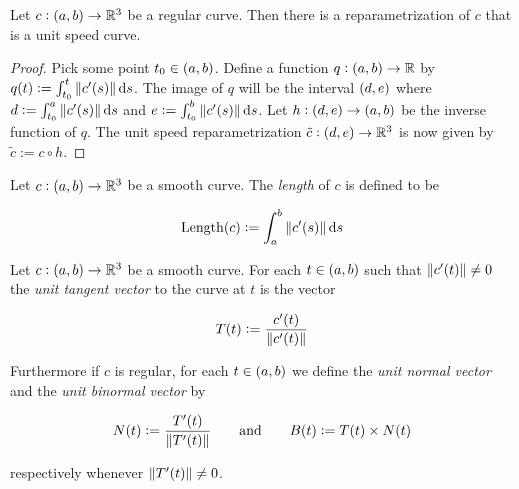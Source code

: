 \vspace{1mm}

\begin{proposition}
	Let $c: \intoo{a,b} \to \mathbb{R}^3$ be a regular curve. Then there is a reparametrization of $c$ that is a unit speed curve.
\end{proposition}

\begin{proof}
	Pick some point $t_0 \in \intoo{a,b}$. Define a function $q: \intoo{a,b} \to \mathbb{R}$ by $q(t) := \int_{t_0}^t \norm[0]{c'(s)} \d s$. The image of $q$ will be the interval $\intoo{d,e}$ where $d := \int_{t_0}^a \norm[0]{c'(s)}\d s$ and $e := \int_{t_0}^b \norm[0]{c'(s)}\d s$. Let $h: \intoo{d,e}\to\intoo{a,b}$ be the inverse function of $q$. The unit speed reparametrization $\tilde{c}: \intoo{d,e}\to \mathbb{R}^3$ is now given by $\tilde{c} := c \circ h$.
\end{proof}

\vspace{1mm}

\begin{definition}
	Let $c: \intoo{a,b} \to \mathbb{R}^3$ be a smooth curve. The \emph{length} of $c$ is defined to be

	\begin{equation}
		\Length(c) := \int_{a}^b \norm[0]{c'(s)} \d s
	\end{equation}
\end{definition}

\vspace{1mm}

\begin{definition}
	Let $c: \intoo{a,b} \to \mathbb{R}^3$ be a smooth curve. For each $t \in \intoo{a,b}$ such that $\norm[0]{c'(t)} \neq 0$ the \emph{unit tangent vector} to the curve at $t$ is the vector 

	\begin{equation}
		T(t) := \frac{c'(t)}{\norm[0]{c'(t)}}
	\end{equation}

	Furthermore if $c$ is regular, for each $t \in \intoo{a,b}$ we define the \emph{unit normal vector} and the \emph{unit binormal vector} by

	\begin{equation}
		N(t) := \frac{T'(t)}{\norm[0]{T'(t)}} \qquad \text{and} \qquad B(t) := T(t) \times N(t)
	\end{equation}

	\noindent respectively whenever $\norm[0]{T'(t)} \neq 0$. 
\end{definition}

